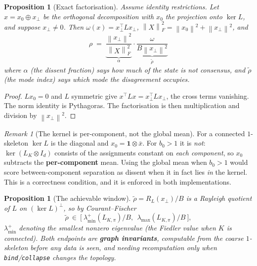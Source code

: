 \documentclass[11pt]{article}
\theoremstyle{definition}
\theoremstyle{plain}
\newtheorem{proposition}[definition]{Proposition}
\theoremstyle{remark}
\newtheorem{remark}[definition]{Remark}
\newcommand{\Kc}{K}                 %
\newcommand{\norm}[1]{\left\lVert #1 \right\rVert}
\begin{document}
\begin{proposition}[Exact factorisation]\label{prop:split}
Assume identity restrictions. Let $x=x_0\oplus x_\perp$ be the orthogonal
decomposition with $x_0$ the projection onto $\ker L$, and suppose $x_\perp\neq0$.
Then $\omega(x)=x_\perp^\top Lx_\perp$, $\norm{X}_F^2=\norm{x_0}^2+\norm{x_\perp}^2$, and
\begin{equation}\label{eq:split}
\boxed{\ \rho\;=\;\underbrace{\frac{\norm{x_\perp}^2}{\norm{X}_F^2}}_{\textstyle\alpha}
\cdot\underbrace{\frac{\omega}{B\norm{x_\perp}^2}}_{\textstyle\tilde\rho}\ }
\end{equation}
where $\alpha$ (the \emph{dissent fraction}) says \emph{how much} of the state is not
consensus, and $\tilde\rho$ (the \emph{mode index}) says \emph{which mode} the
disagreement occupies.
\end{proposition}
\begin{proof}
$Lx_0=0$ and $L$ symmetric give $x^\top Lx=x_\perp^\top Lx_\perp$, the cross terms
vanishing. The norm identity is Pythagoras. The factorisation is then multiplication
and division by $\norm{x_\perp}^2$.
\end{proof}

\begin{remark}[The kernel is per-component, not the global mean]\label{rem:percomp}
For a connected $1$-skeleton $\ker L$ is the diagonal and $x_0=\mathbf1\otimes\bar x$.
For $b_0>1$ it is \emph{not}: $\ker(L_\Kc\otimes I_d)$ consists of the assignments
constant on \emph{each component}, so $x_0$ subtracts the \textbf{per-component}
mean. Using the global mean when $b_0>1$ would score between-component separation as
dissent when it in fact lies \emph{in} the kernel. This is a correctness condition,
and it is enforced in both implementations.
\end{remark}

\begin{proposition}[The achievable window]\label{prop:window}
$\tilde\rho=R_L(x_\perp)/B$ is a Rayleigh quotient of $L$ on $(\ker L)^\perp$, so by
Courant--Fischer
\begin{equation}\label{eq:window}
\tilde\rho\ \in\ \Big[\ \lambda_{\min}^{+}(L_{\Kc,\pi})/B,\ \ \lambda_{\max}(L_{\Kc,\pi})/B\ \Big],
\end{equation}
$\lambda_{\min}^{+}$ denoting the smallest \emph{nonzero} eigenvalue (the Fiedler value
when $\Kc$ is connected). Both endpoints are \textbf{graph invariants}, computable
from the coarse $1$-skeleton before any data is seen, and needing recomputation only
when \texttt{bind}/\texttt{collapse} changes the topology.
\end{proposition}
\end{document}
